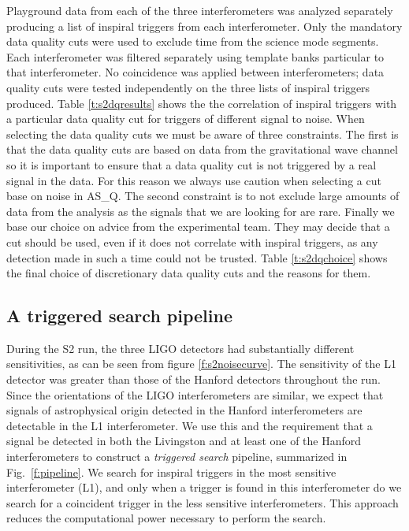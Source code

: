 Playground data from each of the three interferometers was analyzed separately
producing a list of inspiral triggers from each interferometer. Only the
mandatory data quality cuts were used to exclude time from the science mode
segments. Each interferometer was filtered separately using template banks
particular to that interferometer. No coincidence was applied between
interferometers; data quality cuts were tested independently on the three
lists of inspiral triggers produced. Table \ref{t:s2dqresults} shows the the
correlation of inspiral triggers with a particular data quality cut for
triggers of different signal to noise. When selecting the data quality cuts we
must be aware of three constraints. The first is that the data quality cuts
are based on data from the gravitational wave channel so it is important to
ensure that a data quality cut is not triggered by a real signal in the data.
For this reason we always use caution when selecting a cut base on noise in
AS\_Q.  The second constraint is to not exclude large amounts of data from the
analysis as the signals that we are looking for are rare. Finally we base our
choice on advice from the experimental team. They may decide that a
cut should be used, even if it does not correlate with inspiral triggers, as
any detection made in such a time could not be trusted. Table
\ref{t:s2dqchoice} shows the final choice of discretionary data quality cuts
and the reasons for them.

\subsection{A triggered search pipeline}
\label{ss:triggeredsearch}

During the S2 run, the three LIGO detectors had substantially different
sensitivities, as can be seen from figure \ref{f:s2noisecurve}. The
sensitivity of the L1 detector was greater than those of the Hanford detectors
throughout the run. Since the orientations of the LIGO interferometers are
similar, we expect that signals of astrophysical origin detected in the
Hanford interferometers are detectable in the L1 interferometer.  We use this
and the requirement that a signal be detected in both the Livingston and at
least one of the Hanford interferometers to construct a {\em triggered search}
pipeline, summarized in Fig.~\ref{f:pipeline}. We search for inspiral triggers
in the most sensitive interferometer (L1), and only when a trigger is found in
this interferometer do we search for a coincident trigger in the less
sensitive interferometers. This approach reduces the computational power
necessary to perform the search.

